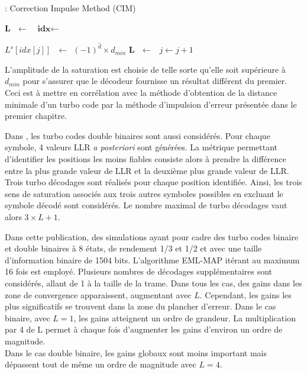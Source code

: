 \begin{center}
\begin{minipage}{.7\textwidth}%
\begin{algorithm}[H]
\caption{: Correction Impulse Method (CIM)}
\label{alg:fsm}
\begin{algorithmic}
\State $\mathbf{L} \ \ \ \gets \ \ $
\State $\textbf{idx} \gets  \ \ $
\State {}

	\State $L^s[idx[j]] \ \ \ \gets \ \ (-1)^{\hat{d}}\times d_{min}$
	\State $\mathbf{L} \ \ \ \gets \ \ $
	\State {}
	\State {}
	\State $j \gets j+1$
\EndWhile
\end{algorithmic}
\end{algorithm}
\end{minipage}
\end{center}

L'amplitude de la saturation est choisie de telle sorte qu'elle soit supérieure à $d_{min}$ pour s'assurer que le décodeur 
fournisse un résultat différent du premier. Ceci est à mettre en corrélation avec la méthode d'obtention de la distance 
minimale d'un turbo code par la méthode d'impulsion d'erreur \cite{eim} présentée dans le premier chapitre.

Dans \cite{cim}, les turbo codes double binaires sont aussi considérés. Pour chaque symbole, 4 valeurs LLR \textit{a 
posteriori} sont générées. La métrique permettant d'identifier les positions les moins fiables consiste alors à prendre 
la différence entre la plus grande valeur de LLR et la deuxième plus grande valeur de LLR. Trois turbo décodages sont 
réalisés pour chaque position identifiée. Ainsi, les trois sens de saturation associés aux trois autres symboles possibles 
en excluant le symbole décodé sont considérés. Le nombre maximal de turbo décodages vaut alors $3\times L + 1$.

Dans cette publication, des simulations ayant pour cadre des turbo codes binaire et double binaires à 8 états, de 
rendement 1/3 et 1/2 et avec une taille d'information binaire de 1504 bits. L'algorithme EML-MAP itérant au maximum 16 fois est
employé. Plusieurs nombres de décodages supplémentaires sont considérés, allant de 1 à la taille de la trame. Dans tous 
les cas, des gains dans les zone de convergence apparaissent, augmentant avec $L$. Cependant, les gains les plus significatifs
se trouvent dans la zone du plancher d'erreur. Dans le cas binaire, avec $L=1$, les gains atteignent un ordre de grandeur. 
La multiplication par 4 de L permet à chaque fois d'augmenter les gains d'environ un ordre de magnitude.\\
Dans le cas double binaire, les gains globaux sont moins important mais dépassent tout de même un ordre de magnitude 
avec $L=4$. 

